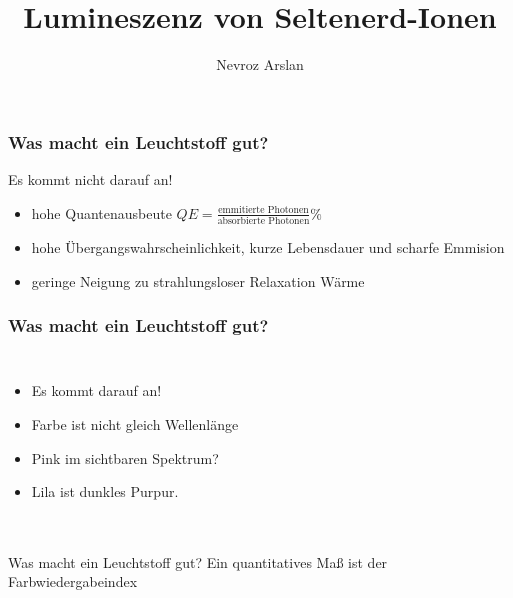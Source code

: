 \documentclass{beamer}
\title{Lumineszenz von Seltenerd-Ionen}
\author{Nevroz Arslan}
\newcommand{\makemycolor}[2]{%
    \pgfmathsetmacro{\hue}{(#1/100)^1.715*0.79}%
    \definecolor{myhsbcolor}{hsb}{\hue,1,1}%
    \textcolor{myhsbcolor}{#2}%
}
\begin{document}
  {%
    \frame{\titlepage}
  }

\begin{frame}[t]\frametitle{Was macht ein Leuchtstoff gut?}
Es kommt nicht darauf an!
\begin{itemize}
   \item hohe Quantenausbeute $QE = \frac{\text{emmitierte \ Photonen}}{\text{absorbierte Photonen}}\%$
   \item hohe Übergangswahrscheinlichkeit, kurze Lebensdauer und scharfe Emmision 
   \item geringe Neigung zu strahlungsloser Relaxation  Wärme
\end{itemize}
   
\end{frame}

\begin{frame}[t]\frametitle{Was macht ein Leuchtstoff gut?}
\begin{columns}
    \begin{itemize}
    \item Es kommt darauf an! 
   \item Farbe ist nicht gleich Wellenlänge
   \item Pink im sichtbaren Spektrum? 
   \item Lila ist dunkles Purpur.
    \end{itemize}

\end{columns}

\end{frame}

\begin{frame}[t]\frametitle{}
    
\begin{beamerboxesrounded}[shadow=true]{Was macht ein Leuchtstoff gut?}
      Ein quantitatives Maß ist der Farbwiedergabeindex 


   \end{beamerboxesrounded}

\end{frame}
   
\end{document}
